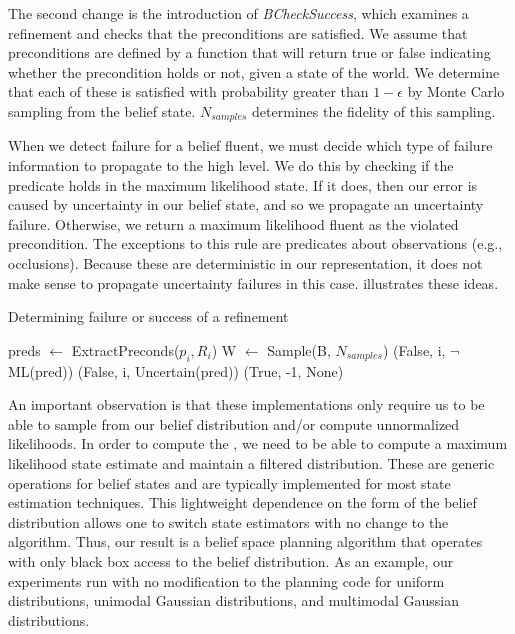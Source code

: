 The second change is the introduction of \emph{BCheckSuccess}, which examines a refinement and
checks that the preconditions
are satisfied. We assume that preconditions are defined by a function
that will return true or false indicating whether the precondition holds or not,
given a state of the world. We determine
that each of these is satisfied with probability greater than
$1-\epsilon$ by Monte Carlo sampling from the belief
state. $N_{samples}$ determines the fidelity of this sampling.

When we detect failure for a belief fluent, we must decide which type
of failure information to propagate to the high level. We do this by
checking if the predicate holds in the maximum likelihood state. If it
does, then our error is caused by uncertainty in our belief state, and so
we propagate an uncertainty failure. Otherwise, we return a maximum
likelihood fluent as the violated precondition. The exceptions to this
rule are predicates about observations (e.g., occlusions). Because
these are deterministic in our representation, it does not make sense
to propagate uncertainty failures in this case. 
illustrates these ideas.


\begin{algorithm}
 \caption{Determining failure or success of a refinement} \label{alg-bcheck}
 \begin{algorithmic}[1]
          \State preds $\leftarrow $ ExtractPreconds($p_i, R_i$)
          \State W $\leftarrow$ Sample(B, $N_{samples}$)
                     \State \Return (False, i, $\lnot$ML(pred))
                 \Else
                     \State \Return (False, i, Uncertain(pred))
                 \EndIf
              \EndIf
          \EndFor
      \EndFor
      \State \Return (True, -1, None)
  \EndProcedure
 \end{algorithmic}
\end{algorithm}
An important observation is that these implementations only require
us to be able to sample from our belief distribution and/or compute
unnormalized likelihoods. In order to compute the \mld{}, we need to be
able to compute a maximum likelihood state estimate and maintain a
filtered distribution. These are generic operations for belief states
and are typically implemented for most state estimation
techniques. This lightweight dependence on the form of the belief
distribution allows one to switch state estimators with no
change to the algorithm. Thus, our result is a belief space planning
algorithm that operates with only black box access to the belief
distribution. As an example, our experiments run with no modification
to the planning code for uniform distributions, unimodal Gaussian
distributions, and multimodal Gaussian distributions.

